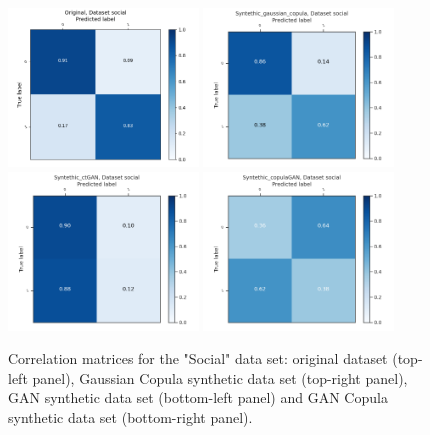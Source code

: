 \documentclass{article}
\begin{document}
\begin{figure}[h!]
	\centering
	\includegraphics[width=0.45\textwidth]{../ConfusionMatrixes/social_Original_.png}
	\includegraphics[width=0.45\textwidth]{../ConfusionMatrixes/social_Syntethic_gaussian_copula_.png}
	\includegraphics[width=0.45\textwidth]{../ConfusionMatrixes/social_Syntethic_ctGAN_.png}
	\includegraphics[width=0.45\textwidth]{../ConfusionMatrixes/social_Syntethic_copulaGAN_.png}
	
	\caption{Correlation matrices for the "Social" data set: original dataset (top-left panel), Gaussian Copula synthetic data set (top-right panel), GAN synthetic data set (bottom-left panel) and GAN Copula synthetic data set (bottom-right panel).  }
	\label{confusion_social}
\end{figure}
\end{document}
